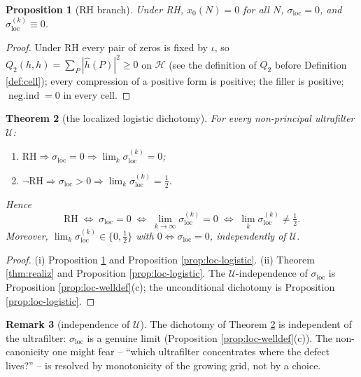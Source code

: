 \documentclass[11pt,reqno]{amsart}
\newtheorem{theorem}{Theorem}[section]
\newtheorem{proposition}[theorem]{Proposition}
\theoremstyle{definition}
\newtheorem{remark}[theorem]{Remark}
\newcommand{\negind}{\operatorname{neg.ind}}
\newcommand{\half}{\tfrac12}
\begin{document}
\begin{proposition}[RH branch]\label{prop:RHbranch}
Under RH, \(x_0(N)=0\) for all \(N\), \(\sigma_{\mathrm{loc}}=0\), and
\(\sigma_{\mathrm{loc}}^{(k)}\equiv0\).
\end{proposition}

\begin{proof}
Under RH every pair of zeros is fixed by \(\iota\), so
\(Q_2(h,h)=\sum_P|\hat h(P)|^2\geq0\) on \(\mathcal H\) (see the definition of
\(Q_2\) before Definition \ref{def:cell}); every compression of a positive form is positive; the
filler is positive; \(\negind=0\) in every cell.
\end{proof}

\begin{theorem}[the localized logistic dichotomy]\label{thm:main}
For every non-principal ultrafilter \(\mathcal U\):
\begin{enumerate}
\item[\textup{(i)}]
\(\mathrm{RH}\Longrightarrow\sigma_{\mathrm{loc}}=0\Longrightarrow
\lim_k\sigma_{\mathrm{loc}}^{(k)}=0\);
\item[\textup{(ii)}] \(\neg\mathrm{RH}\Longrightarrow\sigma_{\mathrm{loc}}>0\Longrightarrow
\lim_k\sigma_{\mathrm{loc}}^{(k)}=\tfrac12\).
\end{enumerate}
Hence
\[
\mathrm{RH}\;\Longleftrightarrow\;\sigma_{\mathrm{loc}}=0\;\Longleftrightarrow\;
\lim_{k\to\infty}\sigma_{\mathrm{loc}}^{(k)}=0\;\Longleftrightarrow\;
\lim_{k}\sigma_{\mathrm{loc}}^{(k)}\neq\tfrac12 .
\]
Moreover, \(\lim_k\sigma_{\mathrm{loc}}^{(k)}\in\{0,\half\}\) with
\(0\iff\sigma_{\mathrm{loc}}=0\), independently of \(\mathcal U\).
\end{theorem}

\begin{proof}
(i) Proposition \ref{prop:RHbranch} and Proposition \ref{prop:loc-logistic}.
(ii) Theorem \ref{thm:realiz} and Proposition \ref{prop:loc-logistic}. The
\(\mathcal U\)-independence of \(\sigma_{\mathrm{loc}}\) is Proposition
\ref{prop:loc-welldef}(c); the unconditional dichotomy is Proposition
\ref{prop:loc-logistic}.
\end{proof}

\begin{remark}[independence of \(\mathcal U\)]
The dichotomy of Theorem \ref{thm:main} is independent of the ultrafilter:
\(\sigma_{\mathrm{loc}}\) is a genuine limit (Proposition
\ref{prop:loc-welldef}(c)). The non-canonicity one might fear -- ``which
ultrafilter concentrates where the defect lives?'' -- is resolved by
monotonicity of the growing grid, not by a choice.
\end{remark}
\end{document}
